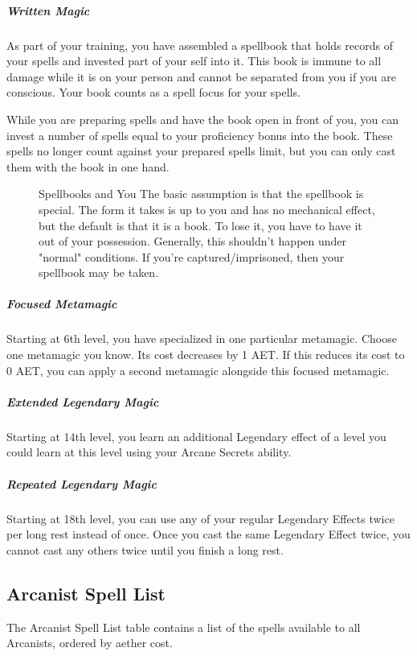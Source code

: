\subparagraph*{Written Magic}
As part of your training, you have assembled a spellbook that holds records of your spells and invested part of your self into it. This book is immune to all damage while it is on your person and cannot be separated from you if you are conscious. Your book counts as a spell focus for your spells.

While you are preparing spells and have the book open in front of you, you can invest a number of spells equal to your proficiency bonus into the book. These spells no longer count against your prepared spells limit, but you can only cast them with the book in one hand.

\begin{figure}
	\begin{DndComment}{Spellbooks and You}
		The basic assumption is that the spellbook is special. The form it takes is up to you and has no mechanical effect, but the default is that it is a book. To lose it, you have to have it out of your possession. Generally, this shouldn't happen under "normal" conditions. If you're captured/imprisoned, then your spellbook may be taken.
	\end{DndComment}
\end{figure}

\subparagraph*{Focused Metamagic}
Starting at 6th level, you have specialized in one particular metamagic. Choose one metamagic you know. Its cost decreases by 1 AET. If this reduces its cost to 0 AET, you can apply a second metamagic alongside this focused metamagic.

\subparagraph*{Extended Legendary Magic}
Starting at 14th level, you learn an additional Legendary effect of a level you could learn at this level using your Arcane Secrets ability.

\subparagraph*{Repeated Legendary Magic}
Starting at 18th level, you can use any of your regular Legendary Effects twice per long rest instead of once. Once you cast the same Legendary Effect twice, you cannot cast any others twice until you finish a long rest.

\subsection{Arcanist Spell List}
The Arcanist Spell List table contains a list of the spells available to all Arcanists, ordered by aether cost.

